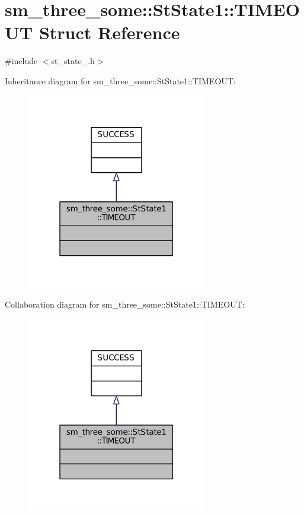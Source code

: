 \hypertarget{structsm__three__some_1_1StState1_1_1TIMEOUT}{}\section{sm\+\_\+three\+\_\+some\+:\+:St\+State1\+:\+:T\+I\+M\+E\+O\+UT Struct Reference}
\label{structsm__three__some_1_1StState1_1_1TIMEOUT}


{\ttfamily \#include $<$st\+\_\+state\+\_.\+h$>$}



Inheritance diagram for sm\+\_\+three\+\_\+some\+:\+:St\+State1\+:\+:T\+I\+M\+E\+O\+UT\+:
\nopagebreak
\begin{figure}[H]
\begin{center}
\leavevmode
\includegraphics[width=223pt]{structsm__three__some_1_1StState1_1_1TIMEOUT__inherit__graph}
\end{center}
\end{figure}


Collaboration diagram for sm\+\_\+three\+\_\+some\+:\+:St\+State1\+:\+:T\+I\+M\+E\+O\+UT\+:
\nopagebreak
\begin{figure}[H]
\begin{center}
\leavevmode
\includegraphics[width=223pt]{structsm__three__some_1_1StState1_1_1TIMEOUT__coll__graph}
\end{center}
\end{figure}


